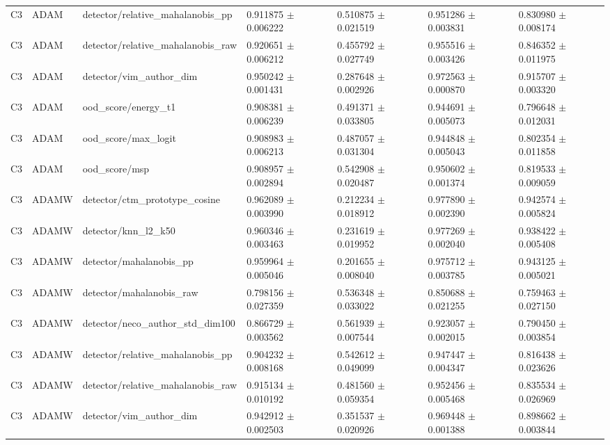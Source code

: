 \begin{longtable}{lllllll}
C3 & ADAM & detector/relative\_mahalanobis\_pp & 0.911875 $\pm$ 0.006222 & 0.510875 $\pm$ 0.021519 & 0.951286 $\pm$ 0.003831 & 0.830980 $\pm$ 0.008174 \\
C3 & ADAM & detector/relative\_mahalanobis\_raw & 0.920651 $\pm$ 0.006212 & 0.455792 $\pm$ 0.027749 & 0.955516 $\pm$ 0.003426 & 0.846352 $\pm$ 0.011975 \\
C3 & ADAM & detector/vim\_author\_dim & 0.950242 $\pm$ 0.001431 & 0.287648 $\pm$ 0.002926 & 0.972563 $\pm$ 0.000870 & 0.915707 $\pm$ 0.003320 \\
C3 & ADAM & ood\_score/energy\_t1 & 0.908381 $\pm$ 0.006239 & 0.491371 $\pm$ 0.033805 & 0.944691 $\pm$ 0.005073 & 0.796648 $\pm$ 0.012031 \\
C3 & ADAM & ood\_score/max\_logit & 0.908983 $\pm$ 0.006213 & 0.487057 $\pm$ 0.031304 & 0.944848 $\pm$ 0.005043 & 0.802354 $\pm$ 0.011858 \\
C3 & ADAM & ood\_score/msp & 0.908957 $\pm$ 0.002894 & 0.542908 $\pm$ 0.020487 & 0.950602 $\pm$ 0.001374 & 0.819533 $\pm$ 0.009059 \\
C3 & ADAMW & detector/ctm\_prototype\_cosine & 0.962089 $\pm$ 0.003990 & 0.212234 $\pm$ 0.018912 & 0.977890 $\pm$ 0.002390 & 0.942574 $\pm$ 0.005824 \\
C3 & ADAMW & detector/knn\_l2\_k50 & 0.960346 $\pm$ 0.003463 & 0.231619 $\pm$ 0.019952 & 0.977269 $\pm$ 0.002040 & 0.938422 $\pm$ 0.005408 \\
C3 & ADAMW & detector/mahalanobis\_pp & 0.959964 $\pm$ 0.005046 & 0.201655 $\pm$ 0.008040 & 0.975712 $\pm$ 0.003785 & 0.943125 $\pm$ 0.005021 \\
C3 & ADAMW & detector/mahalanobis\_raw & 0.798156 $\pm$ 0.027359 & 0.536348 $\pm$ 0.033022 & 0.850688 $\pm$ 0.021255 & 0.759463 $\pm$ 0.027150 \\
C3 & ADAMW & detector/neco\_author\_std\_dim100 & 0.866729 $\pm$ 0.003562 & 0.561939 $\pm$ 0.007544 & 0.923057 $\pm$ 0.002015 & 0.790450 $\pm$ 0.003854 \\
C3 & ADAMW & detector/relative\_mahalanobis\_pp & 0.904232 $\pm$ 0.008168 & 0.542612 $\pm$ 0.049099 & 0.947447 $\pm$ 0.004347 & 0.816438 $\pm$ 0.023626 \\
C3 & ADAMW & detector/relative\_mahalanobis\_raw & 0.915134 $\pm$ 0.010192 & 0.481560 $\pm$ 0.059354 & 0.952456 $\pm$ 0.005468 & 0.835534 $\pm$ 0.026969 \\
C3 & ADAMW & detector/vim\_author\_dim & 0.942912 $\pm$ 0.002503 & 0.351537 $\pm$ 0.020926 & 0.969448 $\pm$ 0.001388 & 0.898662 $\pm$ 0.003844 \\

\end{longtable}
